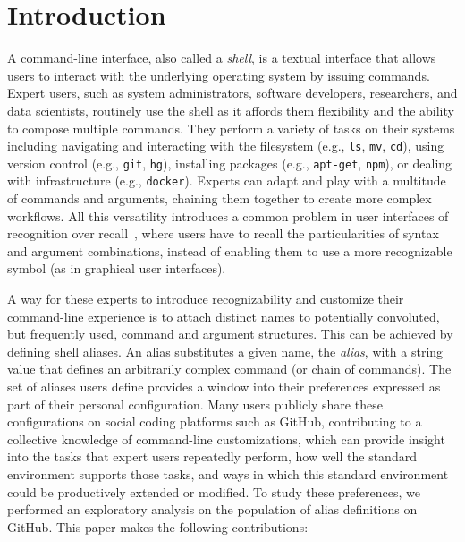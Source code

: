 \documentclass[smallextended,natbib]{svjour3}
\newcommand{\cmd}[1]{{\texttt{#1}}}
\begin{document}
\section{Introduction}

A command-line interface, also called a \emph{shell}, is a textual interface that allows users to interact with the underlying operating system by issuing commands.
Expert users, such as system administrators, software developers, researchers, and data scientists, routinely use the shell as it affords them flexibility and the ability to compose multiple commands.
They perform a variety of tasks on their systems including navigating and interacting with the filesystem (e.g., \cmd{ls}, \cmd{mv}, \cmd{cd}), using version control (e.g., \cmd{git}, \cmd{hg}), installing packages (e.g., \cmd{apt-get}, \cmd{npm}), or dealing with infrastructure (e.g., \cmd{docker}).
Experts can adapt and play with a multitude of commands and arguments, chaining them together to create more complex workflows.
All this versatility introduces a common problem in user interfaces of recognition over recall~\citep{nielsen:05}, where users have to recall the particularities of syntax and argument combinations, instead of enabling them to use a more recognizable symbol (as in graphical user interfaces).

A way for these experts to introduce recognizability and customize their command-line experience is to attach distinct names to potentially convoluted, but frequently used, command and argument structures.
This can be achieved by defining shell aliases.
An alias substitutes a given name, the \emph{alias}, with a string value that defines an arbitrarily complex command (or chain of commands).
The set of aliases users define provides a window into their preferences expressed as part of their personal configuration.
Many users publicly share these configurations on social coding platforms such as GitHub, contributing to a collective knowledge of command-line customizations, which can provide insight into the tasks that expert users repeatedly perform, how well the standard environment supports those tasks, and ways in which this standard environment could be productively extended or modified.
To study these preferences, we performed an exploratory analysis on the population of alias definitions on GitHub. This paper makes the following contributions:
\end{document}
